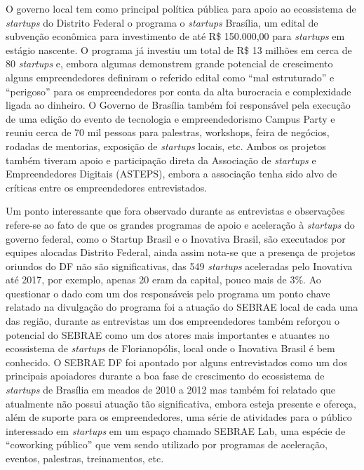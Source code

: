 O governo local tem como principal política pública para apoio ao ecossistema de \textit{startups} do Distrito Federal o programa o \textit{startups} Brasília, um edital de subvenção econômica para investimento de até R\$ 150.000,00 para \textit{startups} em estágio nascente. O programa já investiu um total de R\$ 13 milhões em cerca de 80 \textit{startups} e, embora algumas demonstrem grande potencial de crescimento alguns empreendedores definiram o referido edital como ``mal estruturado'' e ``perigoso'' para os empreendedores por conta da alta burocracia e complexidade ligada ao dinheiro. O Governo de Brasília também foi responsável pela execução de uma edição do evento de tecnologia e empreendedorismo Campus Party e reuniu cerca de 70 mil pessoas para palestras, workshops, feira de negócios, rodadas de mentorias, exposição de \textit{startups} locais, etc. Ambos os projetos também tiveram apoio e participação direta da Associação de \textit{startups} e Empreendedores Digitais (ASTEPS), embora a associação tenha sido alvo de críticas entre os empreendedores entrevistados.

Um ponto interessante que fora observado durante as entrevistas e observações refere-se ao fato de que os grandes programas de apoio e aceleração à \textit{startups} do governo federal, como o Startup Brasil e o Inovativa Brasil, são executados por equipes alocadas Distrito Federal, ainda assim nota-se que a presença de projetos oriundos do DF não são significativas, das 549 \textit{startups} aceleradas pelo Inovativa até 2017, por exemplo, apenas 20 eram da capital, pouco mais de 3\%. Ao questionar o dado com um dos responsáveis pelo programa um ponto chave relatado na divulgação do programa foi a atuação do SEBRAE local de cada uma das região, durante as entrevistas um dos empreendedores também reforçou o potencial do SEBRAE como um dos atores mais importantes e atuantes no ecossistema de \textit{startups} de Florianopólis, local onde o Inovativa Brasil é bem conhecido. O SEBRAE DF foi apontado por alguns entrevistados como um dos principais apoiadores durante a boa fase de crescimento do ecossistema de \textit{startups} de Brasília em meados de 2010 a 2012 mas também foi relatado que atualmente não possui atuação tão significativa, embora esteja presente e ofereça, além de suporte para os empreendedores, uma série de atividades para o público interessado em \textit{startups} em um espaço chamado SEBRAE Lab, uma espécie de ``coworking público'' que vem sendo utilizado por programas de aceleração, eventos, palestras, treinamentos, etc.


